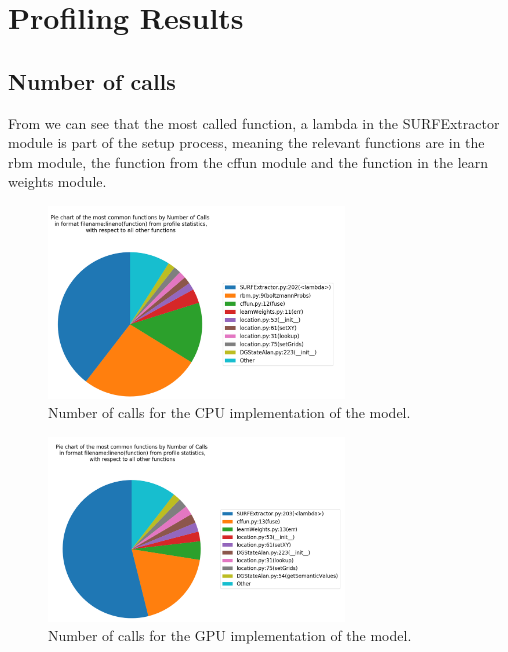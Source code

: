 
\section{Profiling Results}
\subsection{Number of calls}
From  we can see that the most called function, a lambda in the SURFExtractor module is part of the setup process, meaning the relevant functions are  in the rbm module, the  function from the cffun module and the  function in the learn weights module.


\begin{figure}
    \centering
    \includegraphics[width=0.7\textwidth]{figures/res_profiling/number_calls_cpu_crop.png}
    \caption{Number of calls for the CPU implementation of the model.}
    \label{fig:ncc}
\end{figure}

\begin{figure}
    \centering
    \includegraphics[width=0.7\textwidth]{figures/res_profiling/number_calls_gpu_crop.png}
    \caption{Number of calls for the GPU implementation of the model.}
    \label{fig:ncg}
\end{figure}

